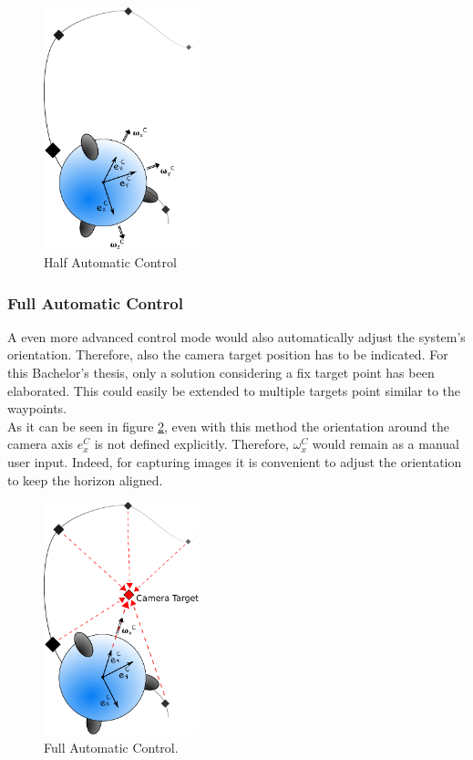\begin{figure}[H] %
	\begin{center}
		\includegraphics[width=0.4\textwidth]{HAC.pdf}
		\caption[Half automatic control]{Half Automatic Control}  
		\label{fig:half_automatic_control}		
	\end{center}
\end{figure}

\subsubsection{Full Automatic Control}
A even more advanced control mode would also automatically adjust the system's orientation. Therefore, also the camera target position has to be indicated. For this Bachelor's thesis, only a solution considering a fix target point has been elaborated. This could easily be extended to multiple targets point similar to the waypoints. \\ As it can be seen in figure \ref{fig:full_automatic_control}, even with this method the orientation around the camera axis $e_x^C$ is not defined explicitly. Therefore, $\omega_x^C$ would remain as a manual user input. Indeed, for capturing images it is convenient to adjust the orientation to keep the horizon aligned.


\begin{figure}[H] %
	\begin{center}
		\includegraphics[width=0.4\textwidth]{FAComega.pdf}
		\caption[Full automatic control]{Full Automatic Control.}  
		\label{fig:full_automatic_control}		
	\end{center}
\end{figure}